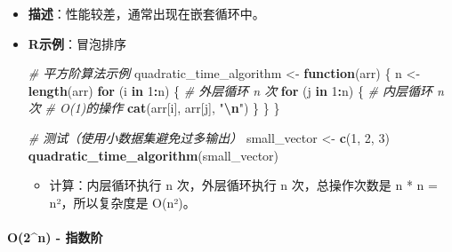 \documentclass[
  twoside]{book}
\newenvironment{Shaded}{\begin{snugshade}}{\end{snugshade}}
\newcommand{\CommentTok}[1]{\textcolor[rgb]{0.56,0.35,0.01}{\textit{#1}}}
\newcommand{\ControlFlowTok}[1]{\textcolor[rgb]{0.13,0.29,0.53}{\textbf{#1}}}
\newcommand{\DecValTok}[1]{\textcolor[rgb]{0.00,0.00,0.81}{#1}}
\newcommand{\FunctionTok}[1]{\textcolor[rgb]{0.13,0.29,0.53}{\textbf{#1}}}
\newcommand{\NormalTok}[1]{#1}
\newcommand{\OtherTok}[1]{\textcolor[rgb]{0.56,0.35,0.01}{#1}}
\newcommand{\SpecialCharTok}[1]{\textcolor[rgb]{0.81,0.36,0.00}{\textbf{#1}}}
\newcommand{\StringTok}[1]{\textcolor[rgb]{0.31,0.60,0.02}{#1}}
\providecommand{\tightlist}{%
  \setlength{\itemsep}{0pt}\setlength{\parskip}{0pt}}
\begin{document}
\begin{itemize}
\item
  \textbf{描述}：性能较差，通常出现在嵌套循环中。
\item
  \textbf{R示例}：冒泡排序

\begin{Shaded}
\begin{Highlighting}[]
\CommentTok{\# 平方阶算法示例}
\NormalTok{quadratic\_time\_algorithm }\OtherTok{\textless{}{-}} \ControlFlowTok{function}\NormalTok{(arr) \{}
\NormalTok{  n }\OtherTok{\textless{}{-}} \FunctionTok{length}\NormalTok{(arr)}
  \ControlFlowTok{for}\NormalTok{ (i }\ControlFlowTok{in} \DecValTok{1}\SpecialCharTok{:}\NormalTok{n) \{        }\CommentTok{\# 外层循环 n 次}
    \ControlFlowTok{for}\NormalTok{ (j }\ControlFlowTok{in} \DecValTok{1}\SpecialCharTok{:}\NormalTok{n) \{      }\CommentTok{\# 内层循环 n 次}
      \CommentTok{\# O(1)的操作}
      \FunctionTok{cat}\NormalTok{(arr[i], arr[j], }\StringTok{"}\SpecialCharTok{\textbackslash{}n}\StringTok{"}\NormalTok{)}
\NormalTok{    \}}
\NormalTok{  \}}
\NormalTok{\}}

\CommentTok{\# 测试（使用小数据集避免过多输出）}
\NormalTok{small\_vector }\OtherTok{\textless{}{-}} \FunctionTok{c}\NormalTok{(}\DecValTok{1}\NormalTok{, }\DecValTok{2}\NormalTok{, }\DecValTok{3}\NormalTok{)}
\FunctionTok{quadratic\_time\_algorithm}\NormalTok{(small\_vector)}
\end{Highlighting}
\end{Shaded}

  \begin{itemize}
  \tightlist
  \item
    计算：内层循环执行 n 次，外层循环执行 n 次，总操作次数是 n * n = n²，所以复杂度是 O(n²)。
  \end{itemize}
\end{itemize}

\hypertarget{o2n---ux6307ux6570ux9636}{%
\paragraph{O(2\^{}n) - 指数阶}\label{o2n---ux6307ux6570ux9636}}
\end{document}
